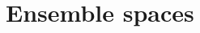 \documentclass[11pt,letterpaper,fleqn]{memoir}
\begin{document}
%	
	
%	
	\chapter*{Ensemble spaces}
	
	
	
	
\end{document}

